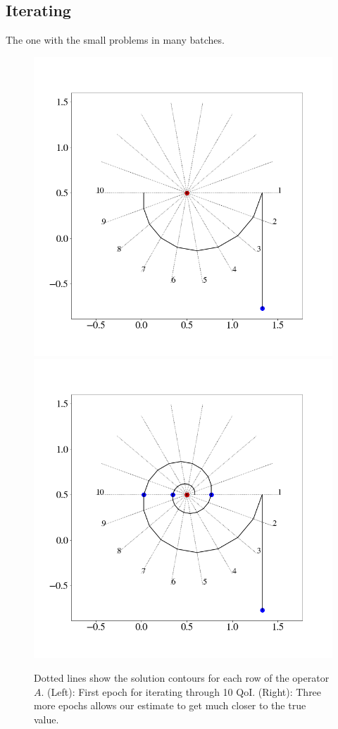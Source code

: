 \subsection{Iterating}

\begin{frame}[t]

The one with the small problems in many batches.

\begin{figure}
  \centering
  \includegraphics[width=0.475\linewidth]{figures/iterative/10D-firstepoch.png}
  \includegraphics[width=0.475\linewidth]{figures/iterative/10D-fewepochs.png}

  \caption{
  Dotted lines show the solution contours for each row of the operator $A$.
  (Left): First epoch for iterating through 10 QoI.
  (Right): Three more epochs allows our estimate to get much closer to the true value.
  }
  \label{fig:iterative-linear-demo}
\end{figure}

\end{frame}

